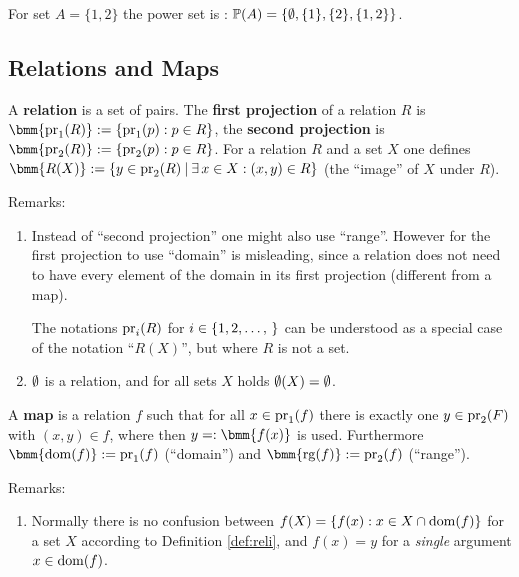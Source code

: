 \documentclass[12pt]{book}
\begin{document}
\begin{examp}\label{exp:infset}
      For set $A= \{1,2\}$ the power set is : $\operatorname{\mathbb{P}}(A)=\{ \emptyset,\{1\},\{2\},\{1,2\}\}$.
\end{examp}
\subsection{Relations and Maps}
\label{sec:maps}

\begin{defi}\label{def:reli}
      A \textbf{relation} is a set of pairs. The \textbf{first projection} of a relation $R$ is $\bmm{\proj_1(R)} := \set{\proj_1(p) : p \in R}$, 
	  the \textbf{second projection} is $\bmm{\proj_2(R)} := \set{\proj_2(p) : p \in R}$. For a relation $R$ and a set $X$ one defines 
	  $\bmm{R(X)}:= \set{y \in \proj_2(R) \mb \ex\, x \in X : (x,y) \in R}$ (the ``image'' of $X$ under $R$).
\end{defi}

Remarks:
\begin{enumerate}
      \item Instead of ``second projection'' one might also use ``range''. However for the first projection to use ``domain'' is misleading, since 
	  a relation does not need to have every element of the domain in its first projection (different from a map).

      The notations $\operatorname{pr}_i(R)$ for $i \in \tb{1,2}$ can be understood as a special case of the notation ``$R(X)$'', but where $R$ is not a set.
      \item $\emptyset$ is a relation, and for all sets $X$ holds $\emptyset(X) = \emptyset$.
\end{enumerate}

\begin{defi}\label{def:map}
      A \textbf{map} is a relation $f$ such that for all $x \in \operatorname{pr}_1(f)$ there is exactly one $y \in \operatorname{pr}_2(F)$ with $(x,y) \in f$, where then 
	  $y =: \bmm{f(x)}$ is used. Furthermore $\bmm{\dom(f)} := \proj_1(f)$ (``domain'') and $\bmm{\rg(f)} := \proj_2(f)$ (``range'').
\end{defi}
Remarks:
\begin{enumerate}
      \item Normally there is no confusion between $f(X) = \{ f(x) : x \in X \cap \operatorname{dom}(f) \}$ for a set $X$ according to Definition \ref{def:reli}, 
	  and $f(x) = y$ for a \emph{single} argument $x \in \operatorname{dom}(f)$.
\end{enumerate}
\end{document}

